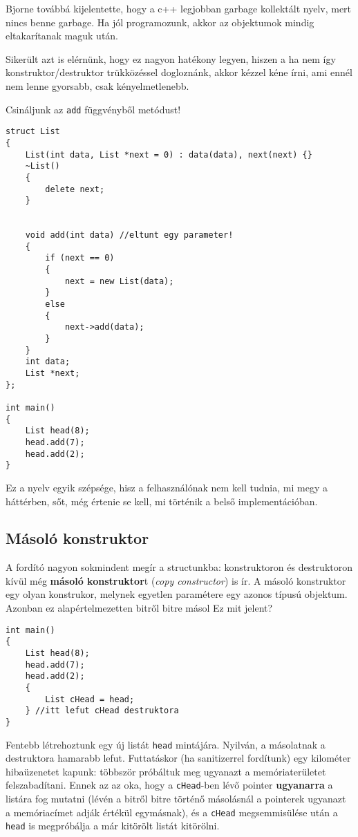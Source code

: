 \documentclass[a4paper,11.5pt,table]{article}
\begin{document}
	Bjorne továbbá kijelentette, hogy a c++ legjobban garbage kollektált nyelv, mert nincs benne garbage. Ha jól programozunk, akkor az objektumok mindig eltakarítanak maguk után. 
	\medskip
	
	Sikerült azt is elérnünk, hogy ez nagyon hatékony legyen, hiszen a ha nem így konstruktor/destruktor trükközéssel dogloznánk, akkor kézzel kéne írni, ami ennél nem lenne gyorsabb, csak kényelmetlenebb.
	
	\medskip
	Csináljunk az \texttt{add} függvényből metódust!
	\begin{lstlisting}
struct List
{
	List(int data, List *next = 0) : data(data), next(next) {}
	~List()
	{
		delete next;
	}
	
	
	void add(int data) //eltunt egy parameter!
	{
		if (next == 0)
		{
			next = new List(data);
		}
		else
		{
			next->add(data);
		}
	}
	int data;
	List *next;
};

int main()
{
	List head(8);
	head.add(7);
	head.add(2);
}
	\end{lstlisting}
	Ez a nyelv egyik szépsége, hisz a felhasználónak nem kell tudnia, mi megy a háttérben, sőt, még értenie se kell, mi történik a belső implementációban.
	\medskip
	
	\subsection{Másoló konstruktor}
	
	A fordító nagyon sokmindent megír a structunkba: konstruktoron és destruktoron kívül még \textbf{másoló konstruktor}t (\textit{copy constructor}) is ír. A másoló konstruktor egy olyan konstrukor, melynek egyetlen paramétere egy azonos típusú objektum. Azonban ez alapértelmezetten bitről bitre másol Ez mit jelent?
	\begin{lstlisting}
int main()
{
	List head(8);
	head.add(7);
	head.add(2);
	{
		List cHead = head;
	} //itt lefut cHead destruktora
}
	\end{lstlisting}
	Fentebb létrehoztunk egy új listát \texttt{head} mintájára. Nyilván, a másolatnak a destruktora hamarabb lefut. Futtatáskor (ha sanitizerrel fordítunk) egy kilométer hibaüzenetet kapunk: többször próbáltuk meg ugyanazt a memóriaterületet felszabadítani. Ennek az az oka, hogy a \texttt{cHead}-ben lévő pointer \textbf{ugyanarra} a listára fog mutatni (lévén a bitről bitre történő másolásnál a pointerek ugyanazt a memóriacímet adják értékül egymásnak), és a \texttt{cHead} megsemmisülése után a \texttt{head} is megpróbálja a már kitörölt listát kitörölni.
	
\end{document}
